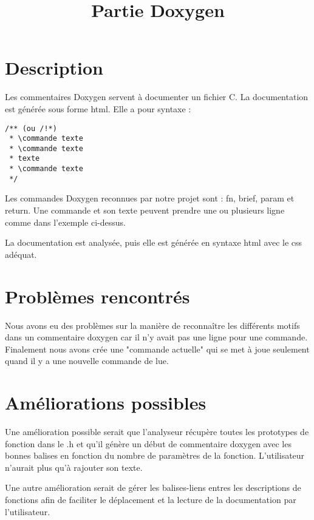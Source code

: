 \documentclass[10pt,a4paper]{report}
\begin{document}
\title{Partie Doxygen}


\section{Description}

Les commentaires Doxygen servent à documenter un fichier C. La documentation est générée sous forme html. Elle a pour syntaxe :
\begin{verbatim}
/** (ou /!*)
 * \commande texte
 * \commande texte
 * texte
 * \commande texte
 */
\end{verbatim}

Les commandes Doxygen reconnues par notre projet sont : fn, brief, param et return. Une commande et son texte peuvent prendre une ou plusieurs ligne comme dans l'exemple ci-dessus.

La documentation est analysée, puis elle est générée en syntaxe html avec le css adéquat.

\section{Problèmes rencontrés}
Nous avons eu des problèmes sur la manière de reconnaître les différents motifs dans un commentaire doxygen car il n'y avait pas une ligne pour une commande. Finalement nous avons crée une "commande actuelle" qui se met à joue seulement quand il y a une nouvelle commande de lue.


\section{Améliorations possibles}
Une amélioration possible serait que l'analyseur récupère toutes les prototypes de fonction dans le .h et qu'il génère un début de commentaire doxygen avec les bonnes balises en fonction du nombre de paramètres de la fonction. L'utilisateur n'aurait plus qu'à rajouter son texte.

Une autre amélioration serait de gérer les balises-liens entres les descriptions de fonctions afin de faciliter le déplacement et la lecture de la documentation par l'utilisateur.
\end{document}
